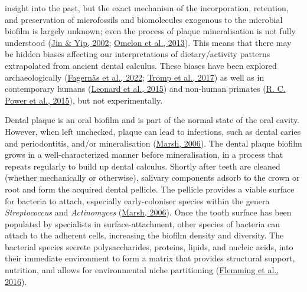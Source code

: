 \documentclass[
  letterpaper,
]{book}
\begin{document}
insight into the past, but the exact mechanism of the incorporation,
retention, and preservation of microfossils and biomolecules exogenous
to the microbial biofilm is largely unknown; even the process of plaque
mineralisation is not fully understood
(\protect\hyperlink{ref-jinSupragingivalCalculus2002}{Jin \& Yip, 2002};
\protect\hyperlink{ref-omelonReviewPhosphate2013}{Omelon et al., 2013}).
This means that there may be hidden biases affecting our interpretations
of dietary/activity patterns extrapolated from ancient dental calculus.
These biases have been explored archaeologically
(\protect\hyperlink{ref-fagernasMicrobialBiogeography2022}{Fagernäs et
al., 2022}; \protect\hyperlink{ref-trompEDTACalculus2017}{Tromp et al.,
2017}) as well as in contemporary humans
(\protect\hyperlink{ref-leonardPlantMicroremains2015}{Leonard et al.,
2015}) and non-human primates
(\protect\hyperlink{ref-powerChimpCalculus2015}{R. C. Power et al.,
2015}), but not experimentally.

Dental plaque is an oral biofilm and is part of the normal state of the
oral cavity. However, when left unchecked, plaque can lead to
infections, such as dental caries and periodontitis, and/or
mineralisation (\protect\hyperlink{ref-marshDentalPlaque2006}{Marsh,
2006}). The dental plaque biofilm grows in a well-characterized manner
before mineralisation, in a process that repeats regularly to build up
dental calculus. Shortly after teeth are cleaned (whether mechanically
or otherwise), salivary components adsorb to the crown or root and form
the acquired dental pellicle. The pellicle provides a viable surface for
bacteria to attach, especially early-coloniser species within the genera
\emph{Streptococcus} and \emph{Actinomyces}
(\protect\hyperlink{ref-marshDentalPlaque2006}{Marsh, 2006}). Once the
tooth surface has been populated by specialists in surface-attachment,
other species of bacteria can attach to the adherent cells, increasing
the biofilm density and diversity. The bacterial species secrete
polysaccharides, proteins, lipids, and nucleic acids, into their
immediate environment to form a matrix that provides structural support,
nutrition, and allows for environmental niche partitioning
(\protect\hyperlink{ref-flemmingBiofilmsEmergent2016}{Flemming et al.,
2016}).
\end{document}
